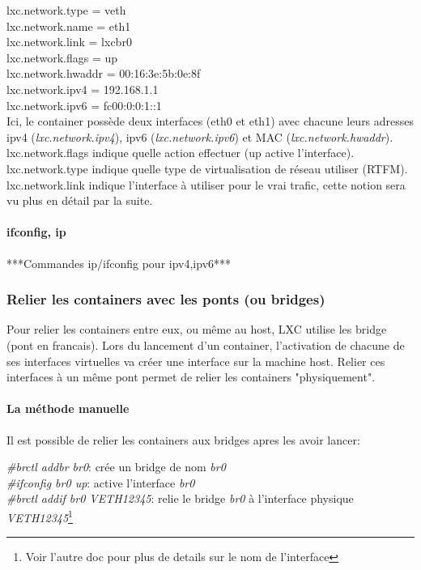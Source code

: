 \noindent
lxc.network.type = veth\\
lxc.network.name = eth1\\
lxc.network.link = lxcbr0\\
lxc.network.flags = up\\
lxc.network.hwaddr = 00:16:3e:5b:0e:8f\\
lxc.network.ipv4 = 192.168.1.1\\
lxc.network.ipv6 = fc00:0:0:1::1\\

Ici, le container poss\`ede deux interfaces (eth0 et eth1) avec chacune leurs adresses ipv4 (\emph{lxc.network.ipv4}),
ipv6 (\emph{lxc.network.ipv6}) et MAC (\emph{lxc.network.hwaddr}).\\
lxc.network.flags indique quelle action effectuer (up active l'interface).\\
lxc.network.type indique quelle type de virtualisation de réseau utiliser (RTFM).\\
lxc.network.link indique l'interface \`a utiliser pour le vrai trafic, cette notion sera vu plus en d\'etail par la suite.\\

\paragraph{ifconfig, ip}

***Commandes ip/ifconfig pour ipv4,ipv6***

\subsubsection{Relier les containers avec les ponts (ou bridges)}

Pour relier les containers entre eux, ou m\^eme au host, LXC utilise les bridge (pont en francais). Lors du
lancement d'un container, l'activation de chacune de ses interfaces virtuelles va cr\'eer une interface sur la machine
host. Relier ces interfaces \`a un m\^eme pont permet de relier les containers "physiquement".

\paragraph{La m\'ethode manuelle}

Il est possible de relier les containers aux bridges apres les avoir lancer:

\noindent
\emph{\#brctl addbr br0}: cr\'ee un bridge de nom \emph{br0}\\
\emph{\#ifconfig br0 up}: active l'interface \emph{br0}\\
\emph{\#brctl addif br0 VETH12345}: relie le bridge \emph{br0} \`a l'interface physique \emph{VETH12345}\footnote{Voir l'autre doc pour plus de details sur le nom de l'interface}\\

